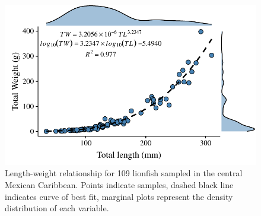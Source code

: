 \documentclass[fleqn,10pt,lineno]{wlpeerj} %
\providecommand{\DIFaddbeginFL}{} %
\providecommand{\DIFaddendFL}{} %
\providecommand{\DIFdelbeginFL}{} %
\providecommand{\DIFdelendFL}{} %
\begin{document}
\begin{figure}
\centering
\DIFdelbeginFL %
\DIFdelendFL \DIFaddbeginFL \includegraphics{Manuscript_files/figure-latex/fit1-1.pdf}
\DIFaddendFL \caption{\label{fig:l-w-carib}Length-weight relationship for 109
lionfish sampled in the central Mexican Caribbean. Points indicate
samples, dashed black line indicates curve of best fit, marginal plots
represent the density distribution of each variable.}
\end{figure}
\end{document}
